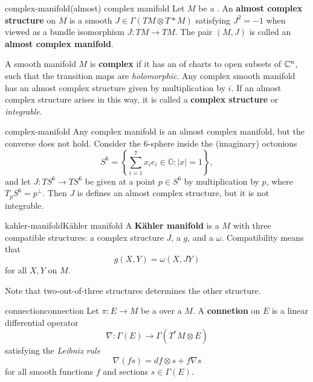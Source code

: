 \begin{topic}{complex-manifold}{(almost) complex manifold}
    Let $M$ be a . An \textbf{almost complex structure} on $M$ is a smooth  $J \in \Gamma(TM \otimes T*M)$ satisfying $J^2 = -1$ when viewed as a bundle isomorphism $J : TM \to TM$. The pair $(M, J)$ is called an \textbf{almost complex manifold}.
    
    A smooth manifold $M$ is \textbf{complex} if it has an  of charts to open subsets of $\mathbb{C}^n$, such that the transition maps are \textit{holomorphic}. Any complex smooth manifold has an almost complex structure given by multiplication by $i$. If an almost complex structure arises in this way, it is called a \textbf{complex structure} or \textit{integrable}.
 \end{topic}
 
 \begin{example}{complex-manifold}
    Any complex manifold is an almost complex manifold, but the converse does not hold. Consider the $6$-sphere inside the (imaginary) octonions
     \[ S^6 = \left\{ \sum_{i = 1}^{7} x_i e_i \in \mathbb{O} : |x| = 1 \right\} , \]
     and let $J : TS^6 \to TS^6$ be given at a point $p \in S^6$ by multiplication by $p$, where $T_p S^6 = p^\perp$. Then $J$ is defines an almost complex structure, but it is not integrable.
 \end{example}

\begin{topic}{kahler-manifold}{Kähler manifold}
    A \textbf{Kähler manifold} is a  $M$ with three compatible structures: a complex structure $J$, a  $g$, and a  $\omega$. Compatibility means that
    \[ g(X, Y) = \omega(X, JY) \]
    for all  $X, Y$ on $M$.
    
    Note that two-out-of-three structures determines the other structure.
\end{topic}

\begin{topic}{connection}{connection}
    Let $\pi : E \to M$ be a  over a  $M$. A \textbf{connetion} on $E$ is a linear differential operator
    \[ \nabla : \Gamma(E) \to \Gamma(T^*M \otimes E) \]
    satisfying the \textit{Leibniz rule}
    \[ \nabla(fs) = df \otimes s + f \nabla s \]
    for all smooth functions $f$ and sections $s \in \Gamma(E)$.
\end{topic}


